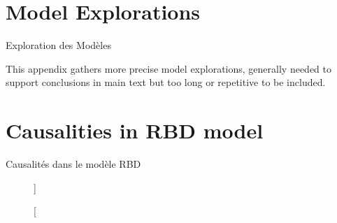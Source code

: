 


\section{Model Explorations}{Exploration des Modèles} %


This appendix gathers more precise model explorations, generally needed to support conclusions in main text but too long or repetitive to be included.






\section{Causalities in RBD model}{Causalités dans le modèle RBD}



\begin{figure}
\caption[][]{}{}
\end{figure}




